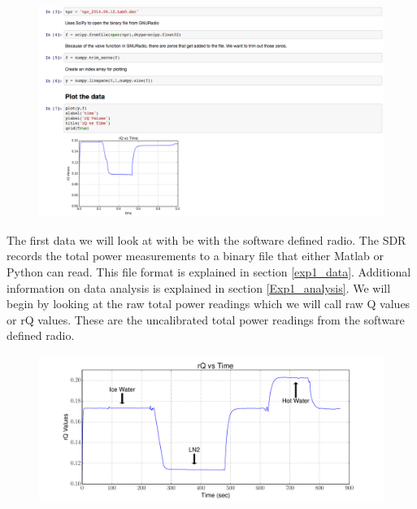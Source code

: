 {\begin{figure}[h!tb] 
\centering
\includegraphics[width=17cm]{Images/python_gnuradio.png}
\label{matlab_display}
\end{figure}

The first data we will look at with be with the software defined radio.  The SDR records the total power measurements to a binary file that either Matlab or Python can read.  This file format is explained in section \ref{exp1_data}. Additional information on data analysis is explained in section \ref{Exp1_analysis}.  We will begin by looking at the raw total power readings which we will call raw Q values or rQ values.  These are the uncalibrated total power readings from the software defined radio.  

\begin{figure}[h!tb] \centering

\includegraphics[width=\textwidth]{Experiments/Exp1/rqvstime_annotate.pdf}
\label{SDR_rQ}
\end{figure}

}
